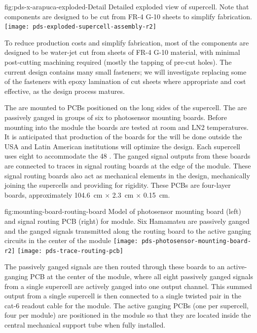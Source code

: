 \begin{dunefigure}{fig:pds-x-arapuca-exploded-Detail}
{Detailed exploded view of  supercell. Note that components are designed to be cut from FR-4 G-10 sheets to simplify fabrication.}
   \texttt{[image: pds-exploded-supercell-assembly-r2]}
\end{dunefigure}

To reduce production costs and simplify fabrication, most of the  components are designed to be water-jet cut from sheets of FR-4 G-10 material, with minimal post-cutting machining required (mostly the tapping of pre-cut holes).  The current design contains many small fasteners; we will investigate replacing some of the fasteners with epoxy lamination of cut sheets where appropriate and cost effective, as the design process matures.

The  are mounted to PCBs positioned on the long sides of the supercell.  
The  are passively ganged in groups of six to photosensor mounting boards.
 Before mounting into the  module the boards are tested at room and LN2 temperatures. It is anticipated that production of the boards for the  will be done outside the USA and Latin American institutions will optimize the design.
  Each supercell uses eight %
 to accommodate the 48 .  The ganged signal outputs from these boards are connected to traces in signal routing boards at the edge of the  module. These signal routing boards also act as mechanical elements in the design, mechanically joining the supercells and providing for rigidity.  These PCBs are four-layer boards, approximately \SI{104.6}{cm} $\times$ \SI{2.3}{cm} $\times$ \SI{0.15}{cm}.

 \begin{dunefigure}
 {fig:mounting-board-routing-board}
{Model of photosensor mounting board (left) and signal routing PCB (right) for  module.  Six Hamamatsu  are passively ganged and the ganged signals transmitted along the routing board to the active ganging circuits in the center of the module}
  \texttt{[image: pds-photosensor-mounting-board-r2]}
  \texttt{[image: pds-trace-routing-pcb]}
\end{dunefigure}
The passively ganged signals are then routed through these boards to an active-ganging PCB at the center of the module, where all eight passively ganged signals from a single supercell are actively ganged into one output channel. This summed output from a single supercell is then connected to a single twisted pair in the cat-6 readout cable for the module.  The active ganging PCBs (one per supercell, four per module) are positioned in the module so that they are located inside the central  mechanical support tube when fully installed.

